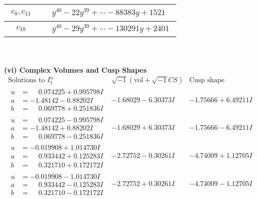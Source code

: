 \documentclass[1p]{elsarticle_modified}
\theoremstyle{definition}
\newcommand{\I}{\sqrt{-1}}
\begin{document}
\begin{tabular}{m{50pt}|m{274pt}}
\hline $$\begin{aligned}c_{8},c_{11}\end{aligned}$$&$\begin{aligned}
&y^{40}-22 y^{39}+\cdots-88383 y+1521
\end{aligned}$\\
\hline $$\begin{aligned}c_{10}\end{aligned}$$&$\begin{aligned}
&y^{40}-29 y^{39}+\cdots-130291 y+2401
\end{aligned}$\\
\hline
\end{tabular}\\~\\
\newpage\flushleft \textbf{(vi) Complex Volumes and Cusp Shapes}
$$\begin{array}{c|c|c}  
\text{Solutions to }I^u_{1}& \I (\text{vol} + \sqrt{-1}CS) & \text{Cusp shape}\\
 \hline 
\begin{aligned}
u &= \phantom{-}0.074225 + 0.995798 I \\
a &= -1.48142 - 0.88202 I \\
b &= \phantom{-}0.069778 + 0.251836 I\end{aligned}
 & -1.68029 - 6.30373 I & -1.75666 + 6.49211 I \\ \hline\begin{aligned}
u &= \phantom{-}0.074225 - 0.995798 I \\
a &= -1.48142 + 0.88202 I \\
b &= \phantom{-}0.069778 - 0.251836 I\end{aligned}
 & -1.68029 + 6.30373 I & -1.75666 - 6.49211 I \\ \hline\begin{aligned}
u &= -0.019908 + 1.014730 I \\
a &= \phantom{-}0.933442 + 0.125283 I \\
b &= \phantom{-}0.321710 + 0.172172 I\end{aligned}
 & -2.72752 - 0.30261 I & -4.74009 + 1.12705 I \\ \hline\begin{aligned}
u &= -0.019908 - 1.014730 I \\
a &= \phantom{-}0.933442 - 0.125283 I \\
b &= \phantom{-}0.321710 - 0.172172 I\end{aligned}
 & -2.72752 + 0.30261 I & -4.74009 - 1.12705 I \\ \hline\begin{aligned}

\end{aligned}
\end{array}$$
\end{document}
